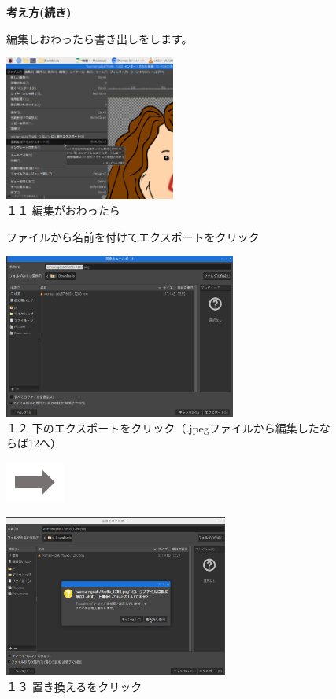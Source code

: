 \documentclass[a4paper,12pt]{jarticle}
\begin{document}
\vfill
\clearpage
\begin{figure}
  \textbf{考え方(続き)}


  編集しおわったら書き出しをします。

  \centering
  \begin{minipage}{\textwidth}
    \includegraphics[width=0.5\textwidth]{textbook-img138.png}\\
    １１ 編集がおわったら

    ファイルから名前を付けてエクスポートをクリック
  \end{minipage}

  \bigskip


  \begin{minipage}{\textwidth}
    \begin{minipage}{7.7cm}
      \includegraphics[width=7.615cm]{textbook-img137.png}\\
      １２
      下のエクスポートをクリック（.jpegファイルから編集したならば12へ）
    \end{minipage}
    \includegraphics[width=1.919cm]{textbook-img135.png}
    \begin{minipage}{7.786cm}
      \includegraphics[width=7.352cm]{textbook-img136.png}\\
      １３ 置き換えるをクリック
    \end{minipage}
  \end{minipage}


\end{figure}
\end{document}
